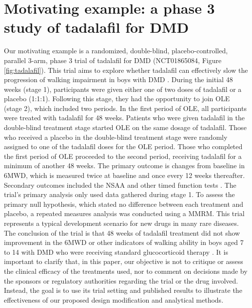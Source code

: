 \section{Motivating example: a phase 3 study of tadalafil for DMD}
\label{sec:example_longitudinal}
Our motivating example is a randomized, double-blind, placebo-controlled, parallel 3-arm, phase 3 trial of tadalafil for \ac{DMD} (NCT01865084, Figure \ref{fig:tadalafil}). This trial aims to explore whether tadalafil can effectively slow the progression of walking impairment in boys with \ac{DMD} . During the initial 48 weeks (stage 1), participants were given either one of two doses of tadalafil or a placebo (1:1:1). Following this stage, they had the opportunity to join \ac{OLE} (stage 2), which included two periods. In the first period of OLE, all participants were treated with tadalafil for 48 weeks. Patients who were given tadalafil in the double-blind treatment stage started \ac{OLE} on the same dosage of tadalafil. Those who received a placebo in the double-blind treatment stage were randomly assigned to one of the tadalafil doses for the \ac{OLE} period. Those who completed the first period of \ac{OLE} proceeded to the second period, receiving tadalafil for a minimum of another 48 weeks. The primary outcome is changes from baseline in \ac{6MWD}, which is measured twice at baseline and once every 12 weeks thereafter. Secondary outcomes included the \ac{NSAA} and other timed function tests \citep{victor2017phase}. The trial's primary analysis only used data gathered during stage 1. To assess the primary null hypothesis, which stated no difference between each treatment and placebo, a repeated measures analysis was conducted using a \ac{MMRM}. This trial represents a typical development scenario for new drugs in many rare diseases. The conclusion of the trial is that 48 weeks of tadalafil treatment did not show improvement in the \ac{6MWD} or other indicators of walking ability in boys aged 7 to 14 with \ac{DMD} who were receiving standard glucocorticoid therapy \citep{victor2017phase}. It is important to clarify that, in this paper, our objective is not to critique or assess the clinical efficacy of the treatments used, nor to comment on decisions made by the sponsors or regulatory authorities regarding the trial or the drug involved. Instead, the goal is to use its trial setting and published results to illustrate the effectiveness of our proposed design modification and analytical methods. 

